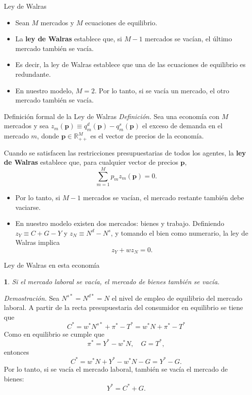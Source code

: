 \documentclass[aspectratio=169,11pt]{beamer}
\newtheorem{proposition}[theorem]{\translate{Proposition}}
\newcommand{\cidehighlight}[1]{\textcolor{CIDEBlue}{\bfseries #1}}
\begin{document}
\begin{frame}{Ley de Walras}
  \begin{itemize}
    \item Sean \(M\) mercados y \(M\) ecuaciones de equilibrio. 
    \item La \cidehighlight{ley de Walras} establece que, si \(M-1\) mercados se vacían, el último mercado también se vacía.
    \item Es decir, la ley de Walras establece que una de las ecuaciones de equilibrio es redundante.
    \item En nuestro modelo, \(M=2\). Por lo tanto, si se vacía un mercado, el otro mercado también se vacía.
  \end{itemize}
\end{frame}


\begin{frame}{Definición formal de la Ley de Walras}
  \textit{Definición.} Sea una economía con \(M\) mercados y sea \(z_m(\mathbf{p}) \equiv q_m^d(\mathbf{p})-q_m^s(\mathbf{p})\) el exceso de demanda en el mercado \(m\), donde \(\mathbf{p}\in\mathbb{R}_{++}^{M}\) es el vector de precios de la economía.

  Cuando se satisfacen las restricciones presupuestarias de todos los
  agentes, la \cidehighlight{ley de Walras} establece que, para cualquier vector de precios \(\mathbf{p}\),
  \[
    \sum_{m=1}^{M} p_m z_m(\mathbf{p})=0.
  \]

  \begin{itemize}
    \item Por lo tanto, si \(M-1\) mercados se vacían, el mercado restante
    también debe vaciarse.

    \item En nuestro modelo existen dos mercados: bienes y trabajo.
    Definiendo $z_Y \equiv C+G-Y $ y $z_N \equiv N^d-N^s$, y tomando el bien como numerario, la ley de Walras implica
    \[
      z_Y+wz_N=0.
    \]
  \end{itemize}
\end{frame}

\begin{frame}{Ley de Walras en esta economía}
  \begin{proposition}
    Si el mercado laboral se vacía, el mercado de bienes también se vacía.
  \end{proposition}
  
  \textit{Demostración.} Sea \(N^{s*}=N^{d*}=N\) el nivel de empleo de equilibrio del mercado laboral. A partir de la recta presupuestaria del consumidor en equilibrio se tiene que
  $$
  C^*=w^*N^{s*} + \pi^* - T^* = w^*N + \pi^* - T^*
  $$
  Como en equilibrio se cumple que
  $$
  \pi^* = Y^* - w^*N, \quad G=T^*,
  $$
  entonces
  $$
  C^* = w^*N + Y^* - w^*N - G = Y^* - G.
  $$
  Por lo tanto, si se vacía el mercado laboral, también se vacía el mercado de bienes:
  $$Y^* = C^* + G.$$
\end{frame}
\end{document}
